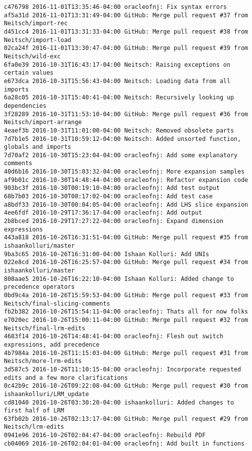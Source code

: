 \begin{lstlisting}
c476798 2016-11-01T13:35:46-04:00 oracleofnj: Fix syntax errors
af5a31d 2016-11-01T13:31:49-04:00 GitHub: Merge pull request #37 from Neitsch/import-rec
d451cc4 2016-11-01T13:31:33-04:00 GitHub: Merge pull request #38 from Neitsch/import-load
02ca24f 2016-11-01T13:30:47-04:00 GitHub: Merge pull request #39 from Neitsch/wild-exc
6fa0e39 2016-10-31T16:43:17-04:00 Neitsch: Raising exceptions on certain values
e673dca 2016-10-31T15:56:43-04:00 Neitsch: Loading data from all imports
6a28c05 2016-10-31T15:40:41-04:00 Neitsch: Recursively looking up dependencies
3f28289 2016-10-31T11:53:10-04:00 GitHub: Merge pull request #36 from Neitsch/import-arrange
4eaef3b 2016-10-31T11:01:00-04:00 Neitsch: Removed obsolete parts
7d7b1e5 2016-10-31T10:59:12-04:00 Neitsch: Added unsorted function, globals and imports
7d70af2 2016-10-30T15:23:04-04:00 oracleofnj: Add some explanatory comments
40d6b16 2016-10-30T15:03:32-04:00 oracleofnj: More expansion samples
af9b01c 2016-10-30T14:48:44-04:00 oracleofnj: Refactor expansion code
903bc3f 2016-10-30T00:19:10-04:00 oracleofnj: Add test output
68b7b03 2016-10-30T00:17:02-04:00 oracleofnj: Add test case
a8bdf33 2016-10-30T00:04:05-04:00 oracleofnj: Add LHS slice expansion
4ee6fdf 2016-10-29T17:36:17-04:00 oracleofnj: Add output
2b8bced 2016-10-29T17:27:22-04:00 oracleofnj: Expand dimension expressions
443a818 2016-10-26T16:31:51-04:00 GitHub: Merge pull request #35 from ishaankolluri/master
9ba3c65 2016-10-26T16:31:00-04:00 Ishaan Kolluri: Add UNIs
022e8cd 2016-10-26T16:25:57-04:00 GitHub: Merge pull request #34 from ishaankolluri/master
808aae5 2016-10-26T16:22:10-04:00 Ishaan Kolluri: Added change to precedence operators
0bd9c4a 2016-10-26T15:59:53-04:00 GitHub: Merge pull request #33 from Neitsch/final-slicing-comments
fb2b382 2016-10-26T15:54:11-04:00 oracleofnj: Thats all for now folks
e7020ec 2016-10-26T15:00:11-04:00 GitHub: Merge pull request #32 from Neitsch/final-lrm-edits
4683f14 2016-10-26T14:48:41-04:00 oracleofnj: Flesh out switch expressions, add precedence
4b7984a 2016-10-26T11:15:03-04:00 GitHub: Merge pull request #31 from Neitsch/more-lrm-edits
3d587c5 2016-10-26T11:10:15-04:00 oracleofnj: Incorporate requested edits and a few more clarifications
0c42b9c 2016-10-26T09:22:08-04:00 GitHub: Merge pull request #30 from ishaankolluri/LRM_update
cd81040 2016-10-26T03:30:20-04:00 ishaankolluri: Added changes to first half of LRM
63fb02b 2016-10-26T02:13:17-04:00 GitHub: Merge pull request #29 from Neitsch/lrm-edits
0941e96 2016-10-26T02:04:47-04:00 oracleofnj: Rebuild PDF
cb04069 2016-10-26T02:04:01-04:00 oracleofnj: Add built in functions

\end{lstlisting}
